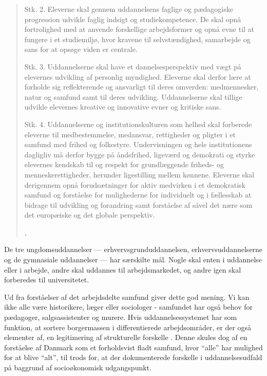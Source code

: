 \blockquote[, \cite{uddannelsesministerietBekendtgorelseAfLov2019}]{

Stk. 2. Eleverne skal gennem uddannelsens faglige og pædagogiske progression udvikle faglig indsigt og studiekompetence. De skal opnå fortrolighed med at anvende forskellige arbejdsformer og opnå evne til at fungere i et studiemiljø, hvor kravene til selvstændighed, samarbejde og sans for at opsøge viden er centrale.

Stk. 3. Uddannelserne skal have et dannelsesperspektiv med vægt på elevernes udvikling af personlig myndighed. Eleverne skal derfor lære at forholde sig reflekterende og ansvarligt til deres omverden: medmennesker, natur og samfund samt til deres udvikling. Uddannelserne skal tillige udvikle elevernes kreative og innovative evner og kritiske sans.

Stk. 4. Uddannelserne og institutionskulturen som helhed skal forberede eleverne til medbestemmelse, medansvar, rettigheder og pligter i et samfund med frihed og folkestyre. Undervisningen og hele institutionens dagligliv må derfor bygge på åndsfrihed, ligeværd og demokrati og styrke elevernes kendskab til og respekt for grundlæggende friheds- og menneskerettigheder, herunder ligestilling mellem kønnene. Eleverne skal derigennem opnå forudsætninger for aktiv medvirken i et demokratisk samfund og forståelse for mulighederne for individuelt og i fællesskab at bidrage til udvikling og forandring samt forståelse af såvel det nære som det europæiske og det globale perspektiv.
}

De tre ungdomsuddannelser --- erhvervsgrunduddannelsen, erhvervsuddannelserne og de gymnasiale uddannelser —  har særskilte mål. Nogle skal enten i uddannelse eller i arbejde, andre skal uddannes til arbejdsmarkedet, og andre igen skal forberedes til universitetet.

Ud fra forståelser af det arbejdsdelte samfund giver dette god mening.
Vi kan ikke alle være historikere, læger eller sociologer - samfundet har også behov for pædagoger, salgsassistenter og murere.
Hvis uddannelsessystemet har som funktion, at sortere borgermassen i differentierede arbejdsområder, er der også elementer af, en legitimering af strukturelle forskelle .
Denne skules dog af en forståelse af Danmark som et forholdsvist fladt samfund, hvor “alle” har mulighed for at blive “alt”, til trods for, at der dokumenterede forskelle i uddannelsesudfald på baggrund af socioøkonomisk udgangspunkt.



